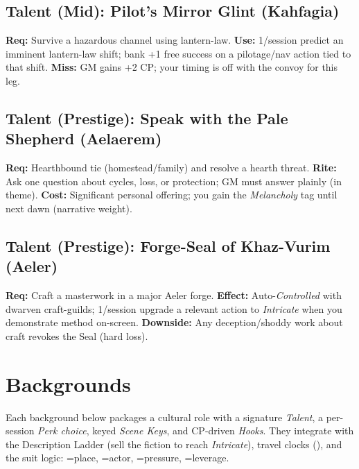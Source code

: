 \subsection{Talent (Mid): Pilot's Mirror Glint (Kahfagia)}
\textbf{Req:} Survive a hazardous channel using lantern-law.
\textbf{Use:} 1/session predict an imminent lantern-law shift; bank +1 free success on a pilotage/nav action tied to that shift.
\textbf{Miss:} GM gains +2 CP; your timing is off with the convoy for this leg.

\subsection{Talent (Prestige): Speak with the Pale Shepherd (Aelaerem)}
\textbf{Req:} Hearthbound tie (homestead/family) and resolve a hearth threat.
\textbf{Rite:} Ask one question about cycles, loss, or protection; GM must answer plainly (in theme).
\textbf{Cost:} Significant personal offering; you gain the \emph{Melancholy} tag until next dawn (narrative weight).

\subsection{Talent (Prestige): Forge-Seal of Khaz-Vurim (Aeler)}
\textbf{Req:} Craft a masterwork in a major Aeler forge.
\textbf{Effect:} Auto-\emph{Controlled} with dwarven craft-guilds; 1/session upgrade a relevant action to \emph{Intricate} when you demonstrate method on-screen.
\textbf{Downside:} Any deception/shoddy work about craft revokes the Seal (hard loss).

\section{Backgrounds}
Each background below packages a cultural role with a signature \emph{Talent}, a per-session \emph{Perk choice}, keyed \emph{Scene Keys}, and CP-driven \emph{Hooks}. They integrate with the Description Ladder (sell the fiction to reach \emph{Intricate}), travel clocks (\ClockSizes), and the suit logic: \SuitSpade{}=place, \SuitHeart{}=actor, \SuitClub{}=pressure, \SuitDiamond{}=leverage.


